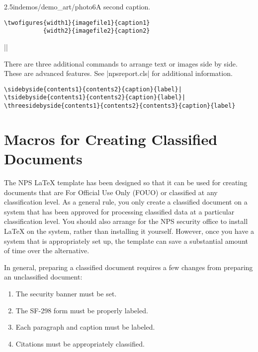            {2.5in}{demos/demo_art/photo6}{A second caption.}

\begin{Verbatim}
\twofigures{width1}{imagefile1}{caption1}
           {width2}{imagefile2}{caption2}
\end{Verbatim}

||

There are three additional commands to arrange text or images side by side.  These are 
advanced features.  See |npsreport.cls| for additional information.

\begin{Verbatim}
\sidebyside{contents1}{contents2}{caption}{label}|
\tsidebyside{contents1}{contents2}{caption}{label}|
\threesidebyside{contents1}{contents2}{contents3}{caption}{label}
\end{Verbatim}

\section{Macros for Creating Classified Documents}

The NPS \LaTeX{} template has been designed so that it can be used
for creating documents that are For Official Use Only (FOUO) or
classified at any classification level. As a general rule, you only
create a classified document on a system that has been approved for
processing classified data at a particular classification level. You
should also arrange for the NPS security office to install \LaTeX{} on
the system, rather than installing it yourself. However, once you have
a system that is appropriately set up, the template can save a
substantial amount of time over the alternative.

In general, preparing a classified document requires a few
changes from preparing an unclassified document:

\begin{enumerate}
\item The security banner must be set.
\item The SF-298 form must be properly labeled.
\item Each paragraph and caption must be labeled.
\item Citations must be appropriately classified.
\end{enumerate}

